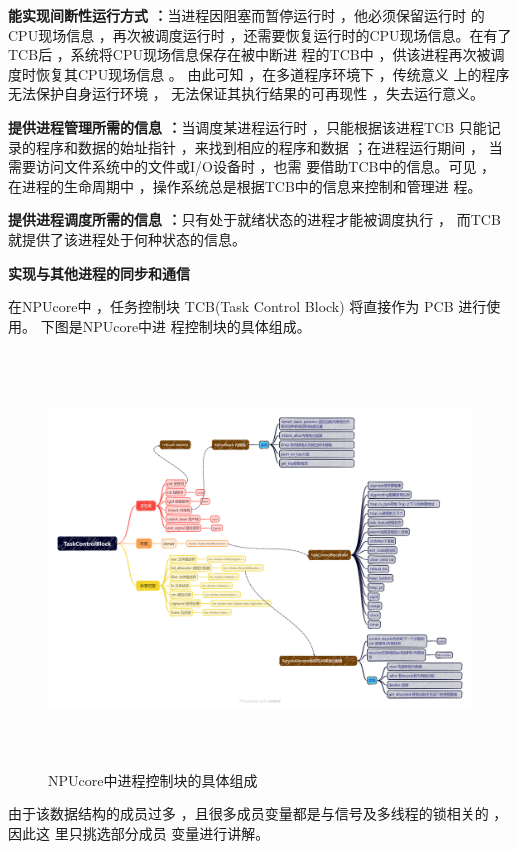 \textbf{能实现间断性运行方式 ：}当进程因阻塞而暂停运行时 ，他必须保留运行时
的CPU现场信息 ，再次被调度运行时 ，还需要恢复运行时的CPU现场信息。在有了
TCB后 ，系统将CPU现场信息保存在被中断进 程的TCB中 ，供该进程再次被调度时恢复其CPU现场信息 。  由此可知 
，在多道程序环境下 ，传统意义 上的程序无法保护自身运行环境 ，
无法保证其执行结果的可再现性 ，失去运行意义。

\textbf{提供进程管理所需的信息 ：}当调度某进程运行时 ，只能根据该进程TCB
只能记录的程序和数据的始址指针 ，来找到相应的程序和数据 ；在进程运行期间 ，  
当需要访问文件系统中的文件或I/O设备时 ，也需 要借助TCB中的信息。可见 ，
在进程的生命周期中 ，操作系统总是根据TCB中的信息来控制和管理进 程。

\textbf{提供进程调度所需的信息 ：}只有处于就绪状态的进程才能被调度执行 ，
而TCB就提供了该进程处于何种状态的信息。

\textbf{实现与其他进程的同步和通信}

在NPUcore中 ，任务控制块 TCB(Task Control Block) 将直接作为 PCB 进行使用。
下图是NPUcore中进 程控制块的具体组成。

\begin{figure}[H]
	\centering
	\includegraphics[width=14cm,height=11cm]{figures/05-02-01-NPUcore中进程控制块的具体组成.png}
	\caption{NPUcore中进程控制块的具体组成}
\end{figure}    

由于该数据结构的成员过多 ，且很多成员变量都是与信号及多线程的锁相关的 ，因此这
里只挑选部分成员 变量进行讲解。

